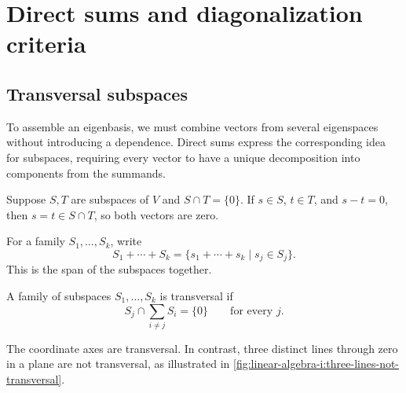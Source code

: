 \section{Direct sums and diagonalization criteria}
\label{sec:linear-algebra-i:direct-sums}

\subsection{Transversal subspaces}

To assemble an eigenbasis, we must combine vectors from several
eigenspaces without introducing a dependence. Direct sums express the
corresponding idea for subspaces, requiring every vector to have a unique
decomposition into components from the summands.

Suppose \(S,T\) are subspaces of \(V\) and \(S\cap T=\{0\}\).
If \(s\in S\), \(t\in T\), and \(s-t=0\), then
\(s=t\in S\cap T\), so both vectors are zero.



For a family \(S_1,\ldots,S_k\), write
\[
  S_1+\cdots+S_k
    =\{s_1+\cdots+s_k\mid s_j\in S_j\}.
\]
This is the span of the subspaces together.

\begin{definition}
  A family of subspaces \(S_1,\ldots,S_k\) is transversal if
  \[
    S_j\cap\sum_{i\ne j}S_i=\{0\}\qquad\text{for every }j.
  \]
\end{definition}

The coordinate axes are transversal. In contrast, three distinct lines
through zero in a plane are not transversal, as illustrated in
\autoref{fig:linear-algebra-i:three-lines-not-transversal}.

\begin{marginfigure}[3\baselineskip]
  \centering
  
  \caption[Three lines and transversality]{A real-plane schematic.
    Each pair of distinct lines meets only at zero, but any two span the
    plane. Thus \(S_3\cap(S_1+S_2)=S_3\ne\{0\}\).}
  \label{fig:linear-algebra-i:three-lines-not-transversal}
\end{marginfigure}

